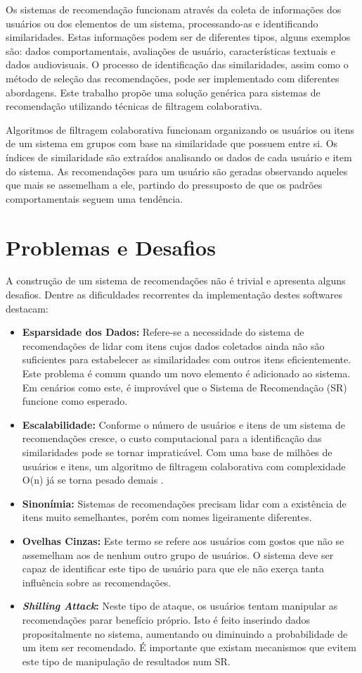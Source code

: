 \documentclass[
	12pt,				%
    oneside,			%
	a4paper,			%
	english,			%
	french,				%
	spanish,			%
	brazil,				%
	]{abntex2}
\begin{document}
Os sistemas de recomendação funcionam através da coleta de informações dos usuários ou dos elementos de um sistema, processando-as e 
identificando similaridades. Estas informações podem ser de diferentes tipos, alguns exemplos são: dados comportamentais, avaliações de usuário,
características textuais e dados audiovisuais. O processo de identificação das similaridades, assim como o método de seleção das recomendações, pode 
ser implementado com diferentes abordagens. Este trabalho propõe uma solução genérica para sistemas de recomendação utilizando técnicas de filtragem colaborativa.

Algoritmos de filtragem colaborativa funcionam organizando os usuários ou itens de um sistema em grupos com base na similaridade que possuem entre si.
Os índices de similaridade são extraídos analisando os dados de cada usuário e item do sistema. As recomendações para um usuário são geradas observando
aqueles que mais se assemelham a ele, partindo do pressuposto de que os padrões comportamentais seguem uma tendência. 

\section{Problemas e Desafios}
A construção de um sistema de recomendações não é trivial e apresenta alguns desafios. Dentre as dificuldades recorrentes da 
implementação destes softwares  destacam:

\begin{itemize}
	\item \textbf{Esparsidade dos Dados:} Refere-se a necessidade do sistema de recomendações de lidar com itens cujos dados coletados ainda não são
	suficientes para estabelecer as similaridades com outros itens eficientemente. Este problema é comum quando um novo elemento é adicionado ao sistema. Em cenários
	como este, é improvável que o Sistema de Recomendação (SR) funcione como esperado.
	\item \textbf{Escalabilidade:} Conforme o número de usuários e itens de um sistema de recomendações cresce, o custo computacional para a identificação
	das similaridades pode se tornar impraticável. Com uma base de milhões de usuários e itens, um algoritmo de filtragem colaborativa com complexidade O(n)
	já se torna pesado demais \cite{2-CFSurvey}. 
	\item \textbf{Sinonímia:} Sistemas de recomendações precisam lidar com a existência de itens muito semelhantes, porém com nomes ligeiramente diferentes.
	\item \textbf{Ovelhas Cinzas:} Este termo se refere aos usuários com gostos que não se assemelham aos de nenhum outro grupo de usuários. O sistema deve
	ser capaz de identificar este tipo de usuário para que ele não exerça tanta influência sobre as recomendações.
	\item \textbf{\textit{Shilling Attack}:} Neste tipo de ataque, os usuários tentam manipular as recomendações parar benefício
	próprio. Isto é feito inserindo dados propositalmente no sistema, aumentando ou diminuindo a probabilidade de um item ser recomendado. É importante que existam
	mecanismos que evitem este tipo de manipulação de resultados num SR.
\end{itemize}
\end{document}
